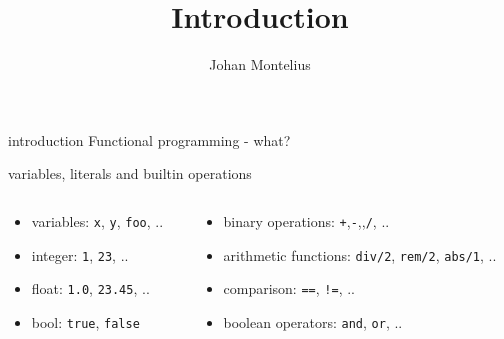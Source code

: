 


\title[ID1019 Introduction]{Introduction}

\author{Johan Montelius}
\date{\semester}



\begin{frame}
\titlepage
\end{frame}

\begin{frame}{introduction}
  Functional programming - what?
\end{frame}

\begin{frame}{variables, literals and builtin operations}

\begin{columns}[t]
 \begin{column}{0.4\linewidth}
   \begin{itemize}
     \pause \item {variables:} {\tt x}, {\tt y}, {\tt foo}, ..
     \pause \item {integer:} {\tt 1}, {\tt 23}, ..
     \pause \item {float:} {\tt 1.0}, {\tt 23.45}, ..
     \pause \item {bool:} {\tt true}, {\tt false} 
   \end{itemize}
 \end{column}
 \begin{column}{0.6\linewidth}
  \begin{itemize}
    \pause \item {binary operations:} {\tt +},{\tt -},{\tt *},{\tt /}, ..
    \pause \item {arithmetic functions:} {\tt div/2}, {\tt rem/2}, {\tt abs/1}, ..   
    \pause \item {comparison:} {\tt ==}, {\tt !=}, ..
    \pause \item {boolean operators:} {\tt and}, {\tt or}, ..
  \end{itemize}
 \end{column}
\end{columns}

\vspace{20pt}{\em There are more but this is fine for now.}



\end{frame}


